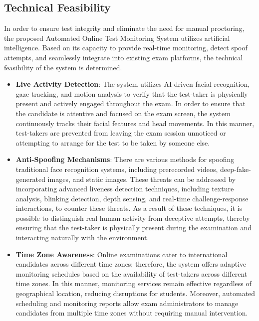 \documentclass[12pt,a4paper]{article}
\begin{document}
\subsection{Technical Feasibility}

In order to ensure test integrity and eliminate the need for manual proctoring, the proposed Automated Online Test Monitoring System utilizes artificial intelligence. Based on its capacity to provide real-time monitoring, detect spoof attempts, and seamlessly integrate into existing exam platforms, the technical feasibility of the system is determined.

\begin{itemize}
    \item \textbf{Live Activity Detection}: The system utilizes AI-driven facial recognition, gaze tracking, and motion analysis to verify that the test-taker is physically present and actively engaged throughout the exam. In order to ensure that the candidate is attentive and focused on the exam screen, the system continuously tracks their facial features and head movements. In this manner, test-takers are prevented from leaving the exam session unnoticed or attempting to arrange for the test to be taken by someone else.

    \item \textbf{Anti-Spoofing Mechanisms}: There are various methods for spoofing traditional face recognition systems, including prerecorded videos, deep-fake-generated images, and static images. These threats can be addressed by incorporating advanced liveness detection techniques, including texture analysis, blinking detection, depth sensing, and real-time challenge-response interactions, to counter these threats. As a result of these techniques, it is possible to distinguish real human activity from deceptive attempts, thereby ensuring that the test-taker is physically present during the examination and interacting naturally with the environment.

    \item \textbf{Time Zone Awareness}: Online examinations cater to international candidates across different time zones; therefore, the system offers adaptive monitoring schedules based on the availability of test-takers across different time zones. In this manner, monitoring services remain effective regardless of geographical location, reducing disruptions for students. Moreover, automated scheduling and monitoring reports allow exam administrators to manage candidates from multiple time zones without requiring manual intervention.


\end{itemize}
\end{document}
